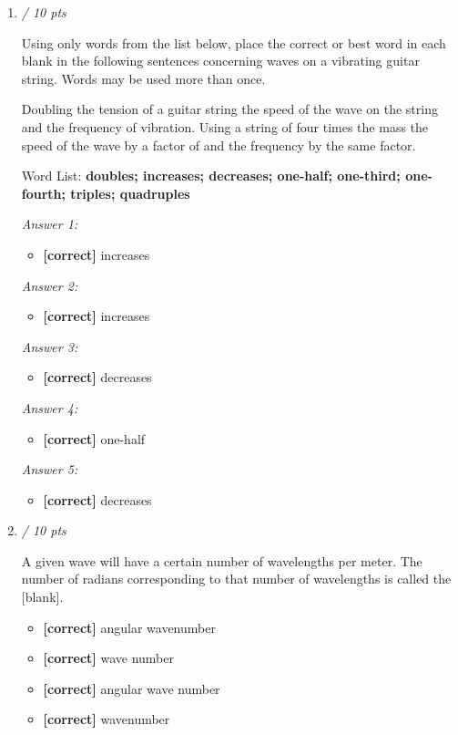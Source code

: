 \documentclass[11pt]{article}
\begin{document}
\begin{enumerate}[leftmargin=*,label=\textbf{Question \arabic*.}]
\item \hfill \textit{/ 10 pts}

Using only words from the list below, place the correct or best word in each blank in the following sentences concerning waves on a vibrating guitar string. Words may be used more than once.

Doubling the tension of a guitar string
 the speed of the wave on the string and
 the frequency of vibration. Using a string of four times the mass
 the speed of the wave by a factor of
 and
 the frequency by the same factor.



Word List: \textbf{doubles; increases; decreases; one-half; one-third; one-fourth; triples; quadruples}

\textit{Answer 1:}
\begin{itemize}
  \item \textbf{[correct]} increases
\end{itemize}
\textit{Answer 2:}
\begin{itemize}
  \item \textbf{[correct]} increases
\end{itemize}
\textit{Answer 3:}
\begin{itemize}
  \item \textbf{[correct]} decreases
\end{itemize}
\textit{Answer 4:}
\begin{itemize}
  \item \textbf{[correct]} one-half
\end{itemize}
\textit{Answer 5:}
\begin{itemize}
  \item \textbf{[correct]} decreases
\end{itemize}

\item \hfill \textit{/ 10 pts}

A given wave will have a certain number of wavelengths per meter. The number of radians corresponding to that number of wavelengths is called the [blank].

\begin{itemize}
  \item \textbf{[correct]} angular wavenumber
  \item \textbf{[correct]} wave number
  \item \textbf{[correct]} angular wave number
  \item \textbf{[correct]} wavenumber
\end{itemize}

\end{enumerate}
\end{document}
